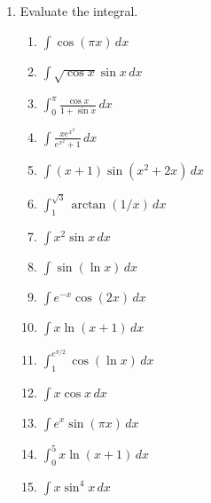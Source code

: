 \documentclass[letterpaper]{article}
\begin{document}
\begin{enumerate}

\item Evaluate the integral.
	\begin{enumerate}

	\item $\displaystyle\int \cos (\pi x) \,dx$

	\item $\int \sqrt{\cos x}\sin x\, dx$

	\item $\int_0^\pi \frac{\cos x}{1+\sin x}\,dx$ 

	\item $\displaystyle\int \frac{x e^{x^2}}{e^{x^2}+1}\, dx$

	\item $\displaystyle\int (x+1) \sin(x^2+2x)\, dx$

	\item $\displaystyle\int_1^{\sqrt{3}} \arctan(1/x)\,dx$

	\item $\displaystyle\int x^2\sin x\,dx$

	\item $\displaystyle\int \sin(\ln x)\, dx$

	\item $\displaystyle\int e^{-x} \cos(2x)\, dx$

	\item $\displaystyle\int x\ln(x+1)\, dx$

	\item $\int_1^{e^{\pi/2}} \cos (\ln x)\,dx$

	\item $\displaystyle\int x\cos x\,dx$

	\item $\displaystyle\int e^x \sin (\pi x)\,dx$

	\item $\displaystyle\int_0^5 x\ln (x+1)\,dx$

	\item $\int x \sin^4 x\,dx$


\end{enumerate}
\end{enumerate}
\end{document}
